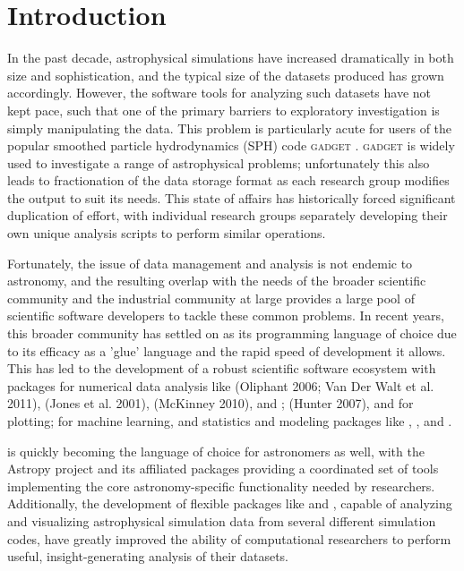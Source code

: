 \section{Introduction}
\label{intro}

In the past decade, astrophysical simulations have increased dramatically in both size and sophistication, and the typical size of the datasets produced has grown accordingly.  
However, the software tools for analyzing such datasets have not kept pace, such that one of the primary barriers to exploratory investigation is simply manipulating the data.  
This problem is particularly acute for users of the popular smoothed particle hydrodynamics (SPH) code \textsc{gadget} \citep{SpringelYoshidaWhite2001,Springel2005}.  
\textsc{gadget} is widely used to investigate a range of astrophysical problems; unfortunately this also leads to fractionation of the data storage format as each research group modifies the output to suit its needs.
This state of affairs has historically forced significant duplication of effort, with individual research groups separately developing their own unique analysis scripts to perform similar operations.

Fortunately, the issue of data management and analysis is not endemic to astronomy, and the resulting overlap with the needs of the broader scientific community and the industrial community at large provides a large pool of scientific software developers to tackle these common problems.
In recent years, this broader community has settled on  as its programming language of choice due to its efficacy as a 'glue' language and the rapid speed of development it allows.  
This has led to the development of a robust scientific software ecosystem with packages for numerical data analysis like  (Oliphant 2006; Van Der Walt et al. 2011),  (Jones et al. 2001),  (McKinney 2010), and ;  (Hunter 2007), and  for plotting;  for machine learning, and statistics and modeling packages like , , and  \citep{Foreman-Mackeyetal2013}.

 is quickly becoming the language of choice for astronomers as well, with the Astropy project \citep{Robitailleetal2013} and its affiliated packages providing a coordinated set of tools implementing the core astronomy-specific functionality needed by researchers. 
Additionally, the development of flexible  packages like  \citep{Turketal2011} and  \citep{Pontzenetal2013}, capable of analyzing and visualizing astrophysical simulation data from several different simulation codes, have greatly improved the ability of computational researchers to perform useful, insight-generating analysis of their datasets.

